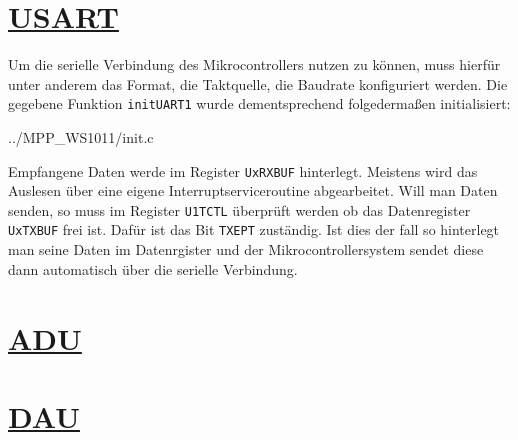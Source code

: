 \documentclass[11pt,german]{scrartcl}
\begin{document}





\clearpage
\section
{\href{http://cst.mi.fu-berlin.de/intern/19606-P-MPP/Aufgaben/040700.html}
{USART}}

Um die serielle Verbindung des Mikrocontrollers nutzen zu können, muss hierfür unter anderem das Format, die Taktquelle, die Baudrate konfiguriert werden. Die gegebene Funktion \texttt{initUART1} wurde dementsprechend folgedermaßen initialisiert:

{../MPP_WS1011/init.c}

Empfangene Daten werde im Register \texttt{UxRXBUF} hinterlegt. Meistens wird das Auslesen über eine eigene Interruptserviceroutine abgearbeitet. Will man Daten senden, so muss im Register \texttt{U1TCTL} überprüft werden ob das Datenregister \texttt{UxTXBUF} frei ist. Dafür ist das Bit \texttt{TXEPT} zuständig. Ist dies der fall so hinterlegt man seine Daten im Datenrgister und der Mikrocontrollersystem sendet diese dann automatisch über die serielle Verbindung.





\clearpage
\section
{\href{http://cst.mi.fu-berlin.de/intern/19606-P-MPP/Aufgaben/040800.html}
{ADU}}




\clearpage
\section
{\href{http://cst.mi.fu-berlin.de/intern/19606-P-MPP/Aufgaben/040900.html}
{DAU}}


\end{document}
